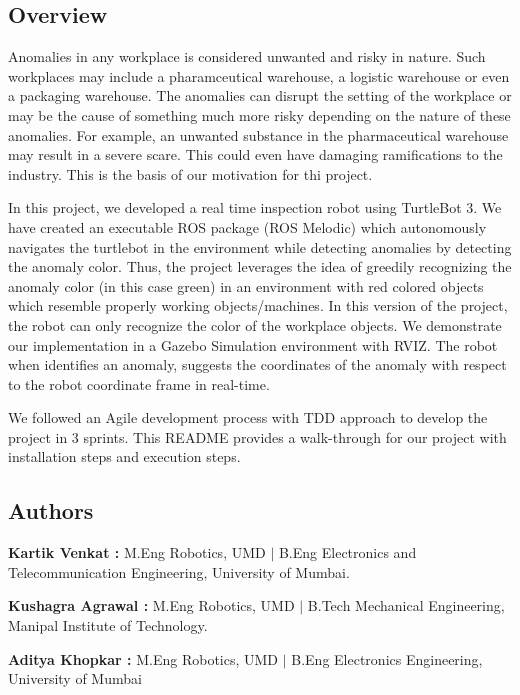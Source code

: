 \href{https://travis-ci.org/kartikv97/turtlebot_inspection_bot}{\tt } \href{https://coveralls.io/github/kartikv97/turtlebot_inspection_bot?branch=master}{\tt } 

 \subsection*{Overview}

Anomalies in any workplace is considered unwanted and risky in nature. Such workplaces may include a pharamceutical warehouse, a logistic warehouse or even a packaging warehouse. The anomalies can disrupt the setting of the workplace or may be the cause of something much more risky depending on the nature of these anomalies. For example, an unwanted substance in the pharmaceutical warehouse may result in a severe scare. This could even have damaging ramifications to the industry. This is the basis of our motivation for thi project. ~\newline


In this project, we developed a real time inspection robot using Turtle\+Bot 3. We have created an executable R\+OS package (R\+OS Melodic) which autonomously navigates the turtlebot in the environment while detecting anomalies by detecting the anomaly color. Thus, the project leverages the idea of greedily recognizing the anomaly color (in this case green) in an environment with red colored objects which resemble properly working objects/machines. In this version of the project, the robot can only recognize the color of the workplace objects. We demonstrate our implementation in a Gazebo Simulation environment with R\+V\+IZ. The robot when identifies an anomaly, suggests the coordinates of the anomaly with respect to the robot coordinate frame in real-\/time. ~\newline


We followed an Agile development process with T\+DD approach to develop the project in 3 sprints. This R\+E\+A\+D\+ME provides a walk-\/through for our project with installation steps and execution steps.

\subsection*{Authors}


\begin{DoxyItemize}
\item {\bfseries Kartik Venkat \+:} M.\+Eng Robotics, U\+MD $\vert$ B.\+Eng Electronics and Telecommunication Engineering, University of Mumbai.
\item {\bfseries Kushagra Agrawal \+:} M.\+Eng Robotics, U\+MD $\vert$ B.\+Tech Mechanical Engineering, Manipal Institute of Technology.
\item {\bfseries Aditya Khopkar \+:} M.\+Eng Robotics, U\+MD $\vert$ B.\+Eng Electronics Engineering, University of Mumbai
\end{DoxyItemize}


